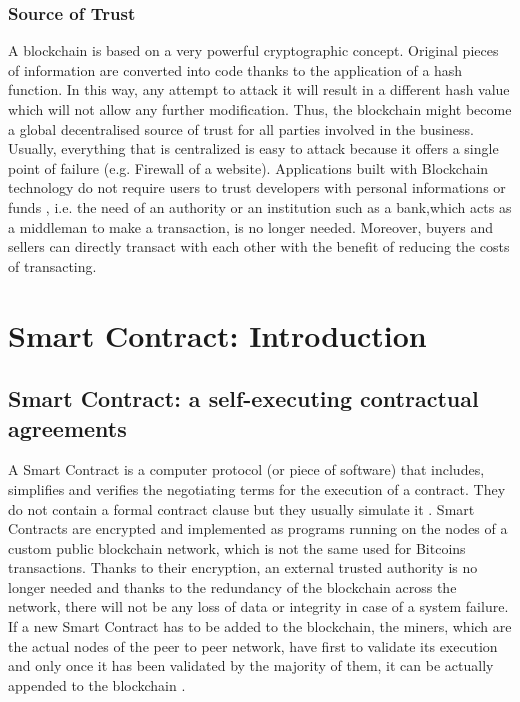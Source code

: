 \subsubsection{Source of Trust}
A blockchain is based on a very powerful cryptographic concept. Original pieces of information are converted into code thanks to the application of a hash function. In this way, any attempt to attack it will result in a different hash value which will not allow any further modification.
Thus, the blockchain might become a global decentralised source of trust \cite{blockchain3} for all parties involved in the business.\\
Usually, everything that is centralized is easy to attack because it offers a single point of failure (e.g. Firewall of a website). 
Applications built with Blockchain technology do not require users to trust developers with personal informations or funds \cite{blockchain3}, i.e. the need of an authority or an institution such as a bank,which acts as a middleman to make a transaction, is no longer needed. Moreover, buyers and sellers can directly transact with each other with the benefit of reducing the costs of transacting.
\section{Smart Contract: Introduction}
\subsection{Smart Contract: a self-executing contractual agreements}
A Smart Contract is a computer protocol (or piece of software) that includes, simplifies and verifies the negotiating terms for the execution of a contract. They do not contain a formal contract clause but they usually simulate it \cite{SC1}.
Smart Contracts are encrypted and implemented as programs running on the nodes of a custom public blockchain network, which is not the same used for Bitcoins transactions. Thanks to their encryption, an external trusted authority is no longer needed and thanks to the redundancy of the blockchain across the network, there will not be any loss of data or integrity in case of a system failure.
If a new Smart Contract has to be added to the blockchain, the miners, which are the actual nodes of the peer to peer network, have first to validate its execution and only once it has been validated by the majority of them, it can be actually appended to the blockchain \cite{SC2}.


